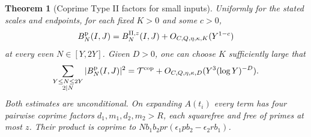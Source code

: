 \documentclass[11pt,a4paper]{article}
\numberwithin{equation}{section}
\newtheorem{theorem}{Theorem}[section]
\begin{document}
\begin{theorem}[Coprime Type II factors for small inputs]
\label{thm:criticalgridcoprimetypeii}
Uniformly for the stated scales and endpoints, for each
fixed $K>0$ and some $c>0$,
\begin{equation}
 B_N^{\rm p}(I,J)=B_N^{\mathrm{II},z}(I,J)
                  +O_{C,Q,\eta,\kappa,K}(Y^{1-c})
 \label{eq:criticalgridtypeiireplacement}
\end{equation}
at every even $N\in[Y,2Y]$. Given $D>0$, one can
choose $K$ sufficiently large that
\begin{equation}
 \sum_{\substack{Y\le N\le2Y\\2\mid N}}
           |B_N^{\rm p}(I,J)|^2
     =\mathcal T^{\rm cop}
        +O_{C,Q,\eta,\kappa,D}(Y^3(\log Y)^{-D}).
 \label{eq:criticalgridcoprimemoment}
\end{equation}
Both estimates are unconditional. On expanding $A(t_i)$
every term has four pairwise coprime factors
$d_1,m_1,d_2,m_2>R$, each squarefree and free of primes
at most $z$. Their product is coprime to
$N b_1b_2pr(\epsilon_1p b_2-\epsilon_2r b_1)$.
\end{theorem}
\end{document}
